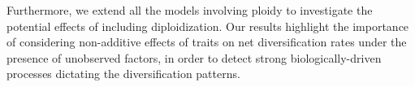 Furthermore, we extend all the models involving ploidy to investigate the potential effects of including diploidization.
Our results highlight the importance of considering non-additive effects of traits on net diversification rates  under the presence of unobserved factors, in order to detect strong biologically-driven processes dictating the diversification patterns.
